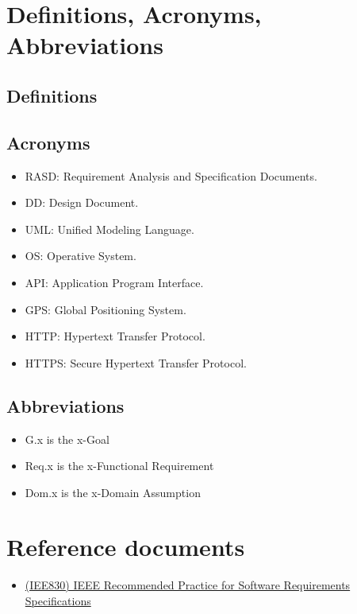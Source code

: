\documentclass{report}
\begin{document}
	\section{Definitions, Acronyms, Abbreviations}
		
		\subsection{Definitions}

		\subsection{Acronyms}
			\begin{itemize}
				\item RASD: Requirement Analysis and Specification Documents.
				\item DD: Design Document.
				\item UML: Unified Modeling Language.
				\item OS: Operative System.
				\item API: Application Program Interface.
				\item GPS: Global Positioning System.
				\item HTTP: Hypertext Transfer Protocol.
				\item HTTPS: Secure Hypertext Transfer Protocol.
			\end{itemize}

		\subsection{Abbreviations}
			\begin{itemize}
				\item G.x is the x-Goal
				\item Req.x is the x-Functional Requirement
				\item Dom.x is the x-Domain Assumption
			\end{itemize}
		
	\section{Reference documents}
		\begin{itemize}
			\item \href{http://www.math.uaa.alaska.edu/~afkjm/cs401/IEEE830.pdf}{(IEE830) IEEE Recommended Practice for Software Requirements Specifications}
		\end{itemize}
		
\end{document}
